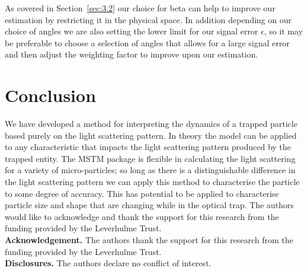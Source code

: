 \documentclass[final, 3p]{elsarticle}
\begin{document}
As covered in Section~\ref{sec:3.2} our choice for beta can help to
improve our estimation by restricting it in the physical space. In
addition depending on our choice of angles we are also setting the
lower limit for our signal error $\epsilon$, so it may be preferable
to choose a selection of angles that allows for a large signal error
and then adjust the weighting factor to improve upon our estimation.


\section{Conclusion}
\label{sec:Conclusion}

We have developed a method for interpreting the dynamics of a trapped
particle based purely on the light scattering pattern. In theory the
model can be applied to any characteristic that impacts the light
scattering pattern produced by the trapped entity. The MSTM package is
flexible in calculating the light scattering for a variety of
micro-particles; so long as there is a distinguishable difference in
the light scattering pattern we can apply this method to characterise
the particle to some degree of accuracy. This has potential to be
applied to characterise particle size and shape that are changing
while in the optical trap. The authors would like to acknowledge and
thank the support for this research from the funding provided by the
Leverhulme Trust.\\



\noindent \textbf{Acknowledgement.} The authors thank the support for this research from the funding provided by the Leverhulme Trust. \\
  
\noindent \textbf{Disclosures.} The authors declare no conflict of interest. \\


 



\newpage
\appendix
\onecolumn
\end{document}
